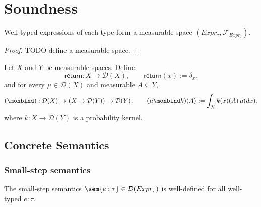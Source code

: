 \section{Soundness}

\begin{lemma}
  Well-typed expressions of each type form a measurable space $(Expr_\tau, \mathcal{F}_{Expr_{\tau}})$.
\end{lemma}

\begin{proof}
  TODO define a measurable space.
\end{proof}

\begin{definition}
  Let $X$ and $Y$ be measurable spaces. Define: 
  \[
    \mathsf{return} : X \to \mathcal{D}(X),
    \qquad
    \mathsf{return}(x) := \delta_x.
  \]
  and for every
  $\mu\in\mathcal{D}(X)$ and measurable $A\subseteq Y$,
  \[
    (\monbind)
    :
    \mathcal{D}(X)
    \to
    \bigl(X \to \mathcal{D}(Y)\bigr)
    \to
    \mathcal{D}(Y),
    \qquad 
    (\mu\monbind k)(A)
    :=
    \int_X k(x)(A)\,\mu(dx).
  \]
  where $k:X\to\mathcal{D}(Y)$ is a probability kernel. 
\end{definition}

\subsection{Concrete Semantics}
\subsubsection{Small-step semantics}

\begin{lemma}
  The small-step semantics $\sem{e : \tau} \in \mathcal{D}(Expr_{\tau})$ is well-defined for all well-typed $e : \tau$.
\end{lemma}

